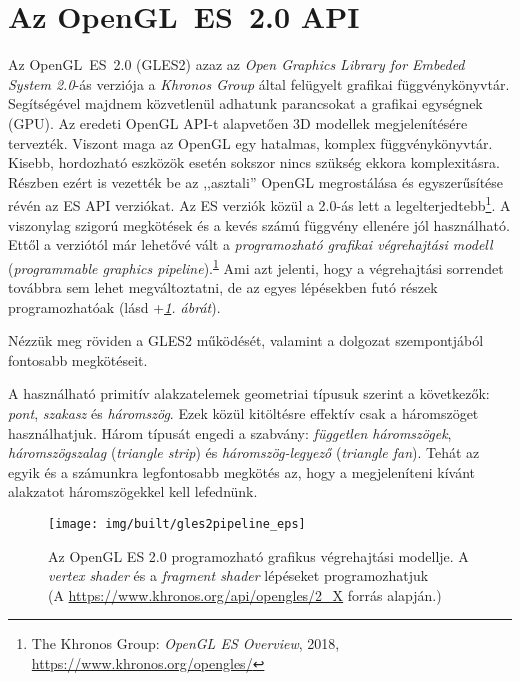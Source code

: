 \documentclass[12pt]{report}
\theoremstyle{definition}
\newcommand{\inenglish}[1]{\textsl{#1}}
\begin{document}
    \section{Az OpenGL~ES~2.0 API}
    \label{sec:GLES2:API}

Az OpenGL~ES~2.0 (GLES2) azaz az \emph{Open Graphics Library for Embeded System
2.0}-ás verziója a \emph{Khronos Group} által felügyelt grafikai
függvénykönyvtár.  Segítségével majdnem közvetlenül adhatunk parancsokat a
grafikai egységnek (GPU). Az eredeti OpenGL API-t alapvetően 3D modellek
megjelenítésére tervezték. Viszont maga az OpenGL egy hatalmas, komplex
függvénykönyvtár. Kisebb, hordozható eszközök esetén sokszor nincs szükség
ekkora komplexitásra. Részben ezért is vezették be az ,,asztali'' OpenGL
megrostálása és egyszerűsítése révén az ES API verziókat. Az ES verziók közül a
2.0-ás lett a legelterjedtebb\footnote{The Khronos Group: \emph{OpenGL ES
Overview}, 2018,
{\footnotesize\url{https://www.khronos.org/opengles/}}\label{fn:GLES2}}. A
viszonylag szigorú megkötések és a kevés számú függvény ellenére jól
használható. Ettől a verziótól már lehetővé vált a \emph{programozható grafikai
végrehajtási modell} (\inenglish{programmable graphics
pipeline}).\textsuperscript{\ref{fn:GLES2}} Ami azt jelenti, hogy a
végrehajtási sorrendet továbbra sem lehet megváltoztatni, de az egyes
lépésekben futó részek programozhatóak (lásd
\az+\emph{\ref{fig:opengles_20_pipeline2}. ábrát}).

Nézzük meg röviden a GLES2 működését, valamint a dolgozat szempontjából
fontosabb megkötéseit.

A használható primitív alakzatelemek geometriai típusuk szerint a következők:
\emph{pont}, \emph{szakasz} és \emph{háromszög}. Ezek közül kitöltésre effektív
csak a háromszöget használhatjuk. Három típusát engedi a szabvány:
\emph{független háromszögek}, \emph{háromszögszalag} (\inenglish{triangle
strip}) és \emph{háromszög-legyező} (\inenglish{triangle fan}). Tehát az egyik
és a számunkra legfontosabb megkötés az, hogy a megjeleníteni kívánt alakzatot
háromszögekkel kell lefednünk.

  \begin{figure}
    \texttt{[image: img/built/gles2pipeline\_eps]}
    \caption{\label{fig:opengles_20_pipeline2} Az OpenGL ES 2.0 programozható
    grafikus végrehajtási modellje. A \emph{vertex shader} és a \emph{fragment
    shader} lépéseket programozhatjuk \\%
    (A {\footnotesize\url{https://www.khronos.org/api/opengles/2_X}}
    forrás alapján.)}
  \end{figure}
\end{document}
